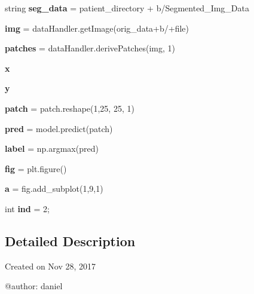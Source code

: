\begin{DoxyCompactItemize}
string {\bfseries seg\+\_\+data} = patient\+\_\+directory + b\textquotesingle{}/Segmented\+\_\+\+Img\+\_\+\+Data\textquotesingle{}
\item 
\mbox{\label{namespaceLoadAndTestModel_a33348f4e675223d4a896ea49c96006c5}} 
{\bfseries img} = data\+Handler.\+get\+Image(orig\+\_\+data+b\textquotesingle{}/\textquotesingle{}+file)
\item 
\mbox{\label{namespaceLoadAndTestModel_a84a090c1f00c1b9a02770619a582339a}} 
{\bfseries patches} = data\+Handler.\+derive\+Patches(img, 1)
\item 
\mbox{\label{namespaceLoadAndTestModel_a078a693ffd488436d6610cb7b8db5c30}} 
{\bfseries x}
\item 
\mbox{\label{namespaceLoadAndTestModel_a5474cd9a9ba829cc8807a8b3c484d4c9}} 
{\bfseries y}
\item 
\mbox{\label{namespaceLoadAndTestModel_af6ad0cf19bc20fe28cad04ea3a4bddee}} 
{\bfseries patch} = patch.\+reshape(1,25, 25, 1)
\item 
\mbox{\label{namespaceLoadAndTestModel_a5a040e43abef25027a7b178ba9631392}} 
{\bfseries pred} = model.\+predict(patch)
\item 
\mbox{\label{namespaceLoadAndTestModel_ab62a1fa52903aca1c27d1f3e4e210deb}} 
{\bfseries label} = np.\+argmax(pred)
\item 
\mbox{\label{namespaceLoadAndTestModel_a0e406681fef2c4c82527e14ce0935a45}} 
{\bfseries fig} = plt.\+figure()
\item 
\mbox{\label{namespaceLoadAndTestModel_aa57d75a246d0fb8c979c611eca57a813}} 
{\bfseries a} = fig.\+add\+\_\+subplot(1,9,1)
\item 
\mbox{\label{namespaceLoadAndTestModel_a691765bd875502b3a9f36f3e758daede}} 
int {\bfseries ind} = 2;
\end{DoxyCompactItemize}


\subsection{Detailed Description}
\begin{DoxyVerb}Created on Nov 28, 2017

@author: daniel
\end{DoxyVerb}
 